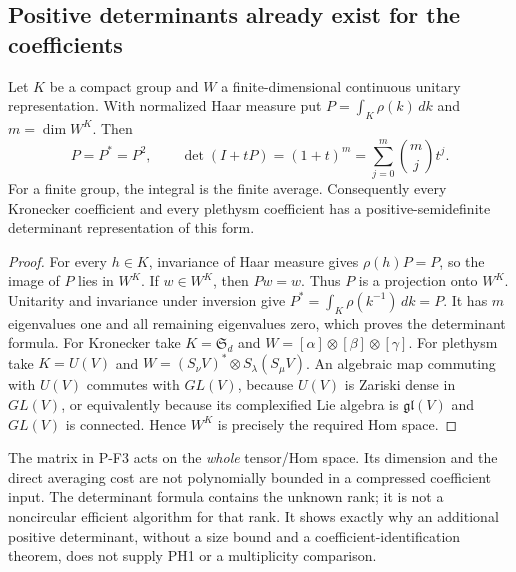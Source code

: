 \subsection{Positive determinants already exist for the coefficients}

\begin{proposition}
\label{prop:projector}
Let $K$ be a compact group and $W$ a finite-dimensional continuous
unitary representation. With normalized Haar measure put
$P=\int_K\rho(k)\,dk$ and $m=\dim W^K$. Then
\[
 P=P^*=P^2,\qquad
 \det(I+tP)=(1+t)^m
 =\sum_{j=0}^{m}\binom mj t^j.
\]
For a finite group, the integral is the finite average.
Consequently every Kronecker coefficient and every plethysm coefficient
has a positive-semidefinite determinant representation of this form.
\end{proposition}
\begin{proof}
For every $h\in K$, invariance of Haar measure gives $\rho(h)P=P$,
so the image of $P$ lies in $W^K$. If $w\in W^K$, then $Pw=w$.
Thus $P$ is a projection onto $W^K$.
Unitarity and invariance under inversion give
$P^*=\int_K\rho(k^{-1})\,dk=P$. It has $m$ eigenvalues one
and all remaining eigenvalues zero, which proves the determinant formula.
For Kronecker take $K=\mathfrak S_d$ and
$W=[\alpha]\otimes[\beta]\otimes[\gamma]$.
For plethysm take $K=U(V)$ and
$W=(S_\nu V)^*\otimes S_\lambda(S_\mu V)$.
An algebraic map commuting with $U(V)$ commutes with $GL(V)$, because
$U(V)$ is Zariski dense in $GL(V)$, or equivalently because its complexified
Lie algebra is $\mathfrak{gl}(V)$ and $GL(V)$ is connected.
Hence $W^K$ is precisely the required Hom space.
\end{proof}

The matrix in P-F3 acts on the \emph{whole} tensor/Hom space. Its
dimension and the direct averaging cost are not polynomially bounded
in a compressed coefficient input. The determinant formula contains the
unknown rank; it is not a noncircular efficient algorithm for that rank.
It shows exactly why an additional positive determinant, without a
size bound and a coefficient-identification theorem, does not supply
PH1 or a multiplicity comparison.

